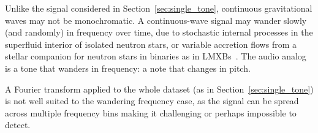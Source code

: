 \documentclass[paper-main.tex]{subfiles}
\begin{document}

Unlike the signal considered in Section~\ref{sec:single_tone}, continuous gravitational waves may not be monochromatic.
A continuous-wave signal may wander slowly (and randomly) in frequency over time, due to stochastic internal processes in the superfluid interior of isolated neutron stars\cite{MelatosDouglassSimula:2015,Jones:2010}, or variable accretion flows from a stellar companion for neutron stars in binaries as in LMXBs~\cite{BildstenTB:1998}. 
The audio analog is a tone that wanders in frequency: a note that changes in pitch. 



A Fourier transform applied to the whole dataset (as in Section~\ref{sec:single_tone}) is not well suited to the wandering frequency case, as the signal can be spread across multiple frequency bins making it challenging or perhaps impossible to detect. 
\end{document}
